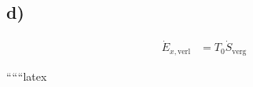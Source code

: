 

\subsection*{d)}
\begin{align*}
\dot{E}_{x, \text{verl}} &= T_0 \dot{S}_{\text{verg}}
\end{align*}

``````latex